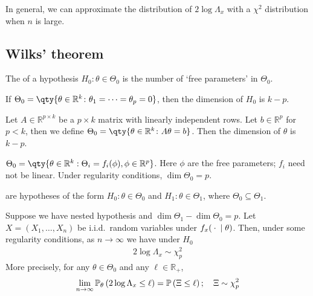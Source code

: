 \begin{note}
	In general, we can approximate the distribution of $2 \log \Lambda_x$ with a $\chi^2$ distribution when $n$ is large.
\end{note} 

\subsection{Wilks' theorem}
\begin{definition}[Dimension]
	The  of a hypothesis $H_0 \colon \theta \in \Theta_0$ is the number of `free parameters' in $\Theta_0$.
\end{definition}

\begin{example}
	If $\Theta_0 = \qty{\theta \in \mathbb R^k \colon \theta_1 = \dots = \theta_p = 0}$, then the dimension of $H_0$ is $k - p$.
\end{example}

\begin{example}
	Let $A \in \mathbb R^{p \times k}$ be a $p \times k$ matrix with linearly independent rows.
	Let $b \in \mathbb R^p$ for $p < k$, then we define $\Theta_0 = \qty{\theta \in \mathbb R^k \colon A\theta = b}$.
	Then the dimension of $\theta$ is $k - p$.
\end{example} 

\begin{example}
	$\Theta_0 = \qty{\theta \in \mathbb{R}^k : \Theta_i = f_i(\phi), \phi \in \mathbb{R}^p}$.
	Here $\phi$ are the free parameters; $f_i$ need not be linear.
	Under regularity conditions, $\dim \Theta_0 = p$.
\end{example} 

\begin{definition}
	 are hypotheses of the form $H_0 \colon \theta \in \Theta_0$ and $H_1 \colon \theta \in \Theta_1$, where $\Theta_0 \subseteq \Theta_1$.
\end{definition}

\begin{theorem} \label{thm:wilks}
	Suppose we have nested hypothesis and $\dim \Theta_1 - \dim \Theta_0 = p$.
	Let $X = (X_1, \dots, X_n)$ be i.i.d.\ random variables under $f_x({}\cdot{}\mid\theta)$.
	Then, under some regularity conditions, as $n \to \infty$ we have under $H_0$
	\begin{align*}
		2\log\Lambda_x \sim \chi_p^2
	\end{align*}
	More precisely, for any $\theta \in \Theta_0$ and any $\ell \in \mathbb R_+$,
	\begin{align*}
		\lim_{n \to \infty} \mathbb{P}_{\theta}\left({2\log \Lambda_x \leq \ell}\right) = \mathbb{P}\left({\Xi \leq \ell}\right);\quad \Xi \sim \chi_p^2
	\end{align*}
\end{theorem}

